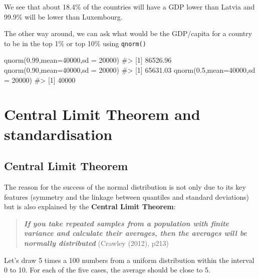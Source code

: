\documentclass[
  letterpaper,
  DIV=11,
  numbers=noendperiod]{scrreprt}
\newenvironment{Shaded}{\begin{snugshade}}{\end{snugshade}}
\newcommand{\AttributeTok}[1]{\textcolor[rgb]{0.40,0.45,0.13}{#1}}
\newcommand{\CommentTok}[1]{\textcolor[rgb]{0.37,0.37,0.37}{#1}}
\newcommand{\DecValTok}[1]{\textcolor[rgb]{0.68,0.00,0.00}{#1}}
\newcommand{\FloatTok}[1]{\textcolor[rgb]{0.68,0.00,0.00}{#1}}
\newcommand{\FunctionTok}[1]{\textcolor[rgb]{0.28,0.35,0.67}{#1}}
\newcommand{\NormalTok}[1]{\textcolor[rgb]{0.00,0.23,0.31}{#1}}
\begin{document}
We see that about 18.4\% of the countries will have a GDP lower than
Latvia and 99.9\% will be lower than Luxembourg.

The other way around, we can ask what would be the GDP/capita for a
country to be in the top 1\% or top 10\% using \texttt{qnorm()}

\begin{Shaded}
\begin{Highlighting}[]
\FunctionTok{qnorm}\NormalTok{(}\FloatTok{0.99}\NormalTok{,}\AttributeTok{mean=}\DecValTok{40000}\NormalTok{,}\AttributeTok{sd =} \DecValTok{20000}\NormalTok{)}
\CommentTok{\#\textgreater{} [1] 86526.96}
\FunctionTok{qnorm}\NormalTok{(}\FloatTok{0.90}\NormalTok{,}\AttributeTok{mean=}\DecValTok{40000}\NormalTok{,}\AttributeTok{sd =} \DecValTok{20000}\NormalTok{)}
\CommentTok{\#\textgreater{} [1] 65631.03}
\FunctionTok{qnorm}\NormalTok{(}\FloatTok{0.5}\NormalTok{,}\AttributeTok{mean=}\DecValTok{40000}\NormalTok{,}\AttributeTok{sd =} \DecValTok{20000}\NormalTok{)}
\CommentTok{\#\textgreater{} [1] 40000}
\end{Highlighting}
\end{Shaded}

\chapter{Central Limit Theorem and
standardisation}\label{sec-central-limit-theorem-and-standardisation}

\section{Central Limit Theorem}\label{central-limit-theorem}

The reason for the success of the normal distribution is not only due to
its key features (symmetry and the linkage between quantiles and
standard deviations) but is also explained by the \textbf{Central Limit
Theorem}:

\begin{quote}
\textbf{\emph{If you take repeated samples from a population with finite
variance and calculate their averages, then the averages will be
normally distributed}} (Crawley (2012), p213)
\end{quote}

Let's draw 5 times a 100 numbers from a uniform distribution within the
interval 0 to 10. For each of the five cases, the average should be
close to 5.
\end{document}
